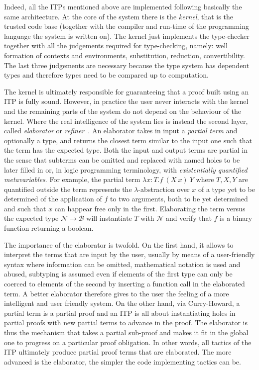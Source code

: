 \documentclass{easychair}
\begin{document}
Indeed, all the ITPs mentioned above are implemented following basically the same architecture. At the core of the system there is the \emph{kernel}, that is the trusted code base (together with the compiler and run-time of the programming language the system is written on). The kernel just implements the type-checker together with all the judgements required for type-checking, namely: well formation of contexts and environments, substitution, reduction, convertibility. The last three judgements are necessary because the type system has dependent types and therefore types need to be compared up to computation.

The kernel is ultimately responsible for guaranteeing that a proof built using an ITP is fully sound. However, in practice the user never interacts with the kernel and the remaining parts of the system do not depend on the behaviour of the kernel. Where the real intelligence of the system lies is instead the second layer, called \emph{elaborator} or \emph{refiner}~\cite{??,??,??}. An elaborator takes in input a \emph{partial term} and optionally a type, and returns the closest term similar to the input one such that the term has the expected type. Both the input and output terms are partial in the sense that subterms can be omitted and replaced with named holes to be later filled in or, in logic programming terminology, with \emph{existentially quantified metavariables}. For example, the partial term $\lambda x: T. f~(X~x)~Y$ where $T,X,Y$ are quantified outside the term represents the $\lambda$-abstraction over $x$ of a type yet to be determined of the application of $f$ to two arguments, both to be yet determined and such that $x$ can happear free only in the first. Elaborating the term versus the expected type $\mathcal{N} \to \mathcal{B}$ will instantiate $T$ with $\mathcal{N}$ and verify that $f$ is a binary function returning a boolean.

The importance of the elaborator is twofold. On the first hand, it allows to interpret the terms that are input by the user, usually by means of a user-friendly syntax where information can be omitted, mathematical notation is used and abused, subtyping is assumed even if elements of the first type can only be coerced to elements of the second by inserting a function call in the elaborated term. A better elaborator therefore gives to the user the feeling of a more intelligent and user friendly system. On the other hand, via Curry-Howard, a partial term is a partial proof and an ITP is all about instantiating holes in partial proofs with new partial terms to advance in the proof. The elaborator is thus the mechanism that takes a partial sub-proof and makes it fit in the global one to progress on a particular proof obligation. In other words, all tactics of the ITP ultimately produce partial proof terms that are elaborated. The more advanced is the elaborator, the simpler the code implementing tactics can be.
\end{document}
